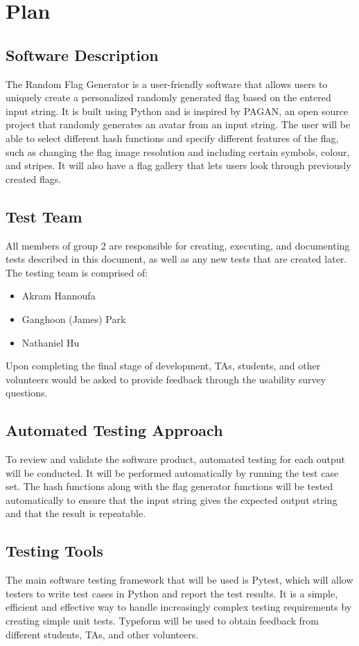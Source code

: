 \documentclass[12pt, titlepage]{article}
\begin{document}
\section{Plan}
    
\subsection{Software Description}
The Random Flag Generator is a user-friendly software that allows users to
uniquely create a personalized randomly generated flag based on the entered
input string. It is built using Python and is inspired by PAGAN, an open
source project that randomly generates an avatar from an input string. The
user will be able to select different hash functions and specify different
features of the flag, such as changing the flag image resolution and including
certain symbols, colour, and stripes. It will also have a flag gallery that
lets users look through previously created flags.

\subsection{Test Team}
All members of group 2 are responsible for creating, executing, and
documenting tests described in this document, as well as any new tests that
are created later. The testing team is comprised of:
\begin{itemize}
    \item Akram Hannoufa
    \item Ganghoon (James) Park
    \item Nathaniel Hu
  \end{itemize}  
Upon completing the final stage of development, TAs, students, and other
volunteers would be asked to provide feedback through the usability survey
questions.

\subsection{Automated Testing Approach}
To review and validate the software product, automated testing for each output
will be conducted. It will be performed automatically by running the test case
set. The hash functions along with the flag generator functions will be tested
automatically to ensure that the input string gives the expected output string
and that the result is repeatable.

\subsection{Testing Tools}
The main software testing framework that will be used is Pytest, which will
allow testers to write test cases in Python and report the test results. It is
a simple, efficient and effective way to handle increasingly complex testing
requirements by creating simple unit tests. Typeform will be used to obtain
feedback from different students, TAs, and other volunteers.
\end{document}
